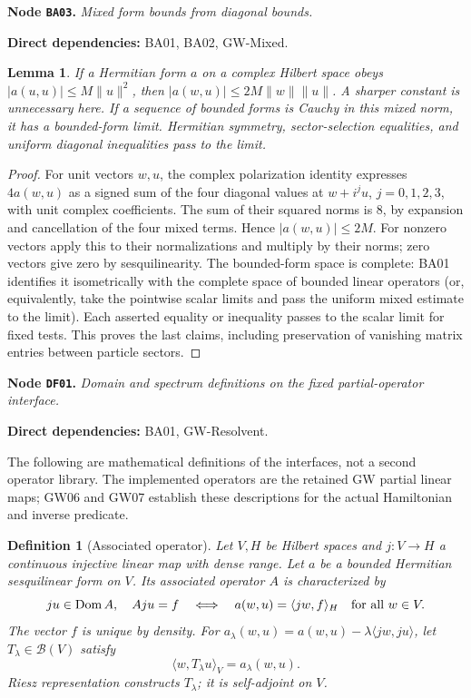 \documentclass[11pt,a4paper]{article}
\newtheorem{lemma}[theorem]{Lemma}
\newtheorem{definition}[theorem]{Definition}
\theoremstyle{remark}\newtheorem{remark}[theorem]{Remark}
\newcommand{\ip}[2]{\langle #1,#2\rangle}\newcommand{\norm}[1]{\lVert #1\rVert}
\newcommand{\node}[3]{\par\Needspace{6\baselineskip}\smallskip\hypertarget{node:#1}{}\label{nodepage:#1}\noindent\textbf{Node \texttt{#1}.} \textit{#2.}\par\noindent\textbf{Direct dependencies:} #3.\par}
\begin{document}
\node{BA03}{Mixed form bounds from diagonal bounds}{BA01, BA02, GW-Mixed}
\begin{lemma}\label{lem:polarizationbound}
If a Hermitian form $a$ on a complex Hilbert space obeys $|a(u,u)|\leq M\|u\|^2$, then
$|a(w,u)|\leq 2M\|w\|\|u\|$. A sharper constant is unnecessary here. If a sequence of bounded forms is Cauchy in this mixed norm, it has a bounded-form limit. Hermitian symmetry, sector-selection equalities, and uniform diagonal inequalities pass to the limit.
\end{lemma}
\begin{proof}
For unit vectors $w,u$, the complex polarization identity expresses $4a(w,u)$ as a signed sum of the four diagonal values at $w+i^ju$, $j=0,1,2,3$, with unit complex coefficients. The sum of their squared norms is $8$, by expansion and cancellation of the four mixed terms. Hence $|a(w,u)|\leq2M$. For nonzero vectors apply this to their normalizations and multiply by their norms; zero vectors give zero by sesquilinearity. The bounded-form space is complete: BA01 identifies it isometrically with the complete space of bounded linear operators (or, equivalently, take the pointwise scalar limits and pass the uniform mixed estimate to the limit). Each asserted equality or inequality passes to the scalar limit for fixed tests. This proves the last claims, including preservation of vanishing matrix entries between particle sectors.
\end{proof}

\node{DF01}{Domain and spectrum definitions on the fixed partial-operator interface}{BA01, GW-Resolvent}
The following are mathematical definitions of the interfaces, not a second operator library. The implemented operators are the retained GW partial linear maps; GW06 and GW07 establish these descriptions for the actual Hamiltonian and inverse predicate.

\begin{definition}[Associated operator]\label{def:associated}
Let $V,H$ be Hilbert spaces and $j:V\to H$ a continuous injective linear map with dense range. Let $a$ be a bounded Hermitian sesquilinear form on $V$. Its associated operator $A$ is characterized by
\[
 ju\in\Dom A,\quad Aju=f
 \quad\Longleftrightarrow\quad
 a(w,u)=\ip{jw}{f}_H\quad\text{for all }w\in V.
\]
The vector $f$ is unique by density. For $a_\lambda(w,u)=a(w,u)-\lambda\ip{jw}{ju}$, let $T_\lambda\in\mathcal B(V)$ satisfy
\[
 \ip{w}{T_\lambda u}_V=a_\lambda(w,u).
\]
Riesz representation constructs $T_\lambda$; it is self-adjoint on $V$.
\end{definition}
\end{document}
